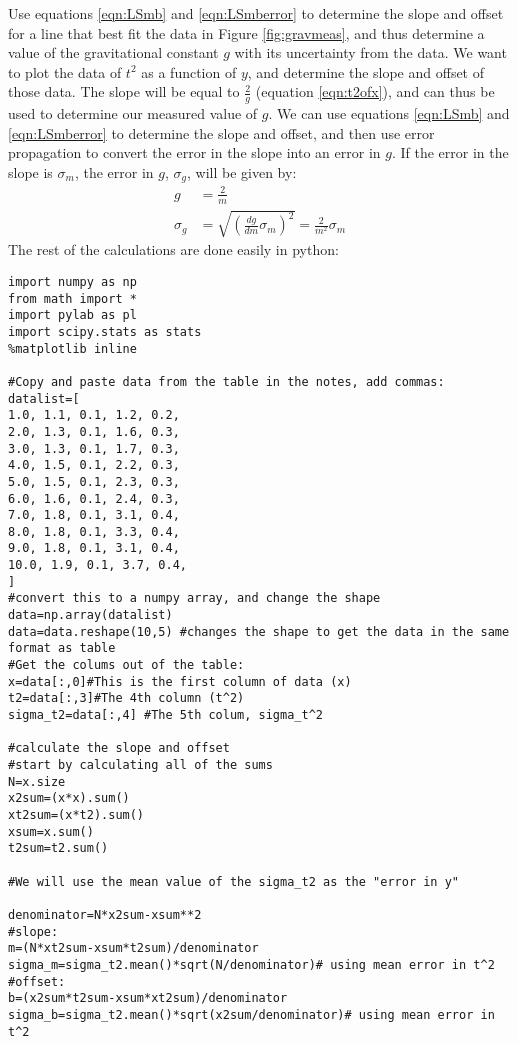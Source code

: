 \begin{example}{}{Use equations \ref{eqn:LSmb} and \ref{eqn:LSmberror} to determine the slope and offset for a line that best fit the data in Figure \ref{fig:gravmeas}, and thus determine a value of the gravitational constant $g$ with its uncertainty from the data.}{}
\label{ex:gravLMfit}
We want to plot the data of $t^2$ as a function of $y$, and determine the slope and offset of those data. The slope will be equal to $\frac{2}{g}$ (equation \ref{eqn:t2ofx}), and can thus be used to determine our measured value of $g$. We can use equations \ref{eqn:LSmb} and \ref{eqn:LSmberror} to determine the slope and offset, and then use error propagation to convert the error in the slope into an error in $g$. If the error in the slope is $\sigma_m$, the error in $g$, $\sigma_g$, will be given by:
\begin{align*}
g&=\frac{2}{m}\\
\sigma_g&=\sqrt{\left(\frac{dg}{dm}\sigma_m\right)^2}=\frac{2}{m^2}\sigma_m
\end{align*}
The rest of the calculations are done easily in python:
\clearpage
\begin{lstlisting}[frame=single] 
import numpy as np
from math import *
import pylab as pl
import scipy.stats as stats
%matplotlib inline

#Copy and paste data from the table in the notes, add commas:
datalist=[
1.0, 1.1, 0.1, 1.2, 0.2,
2.0, 1.3, 0.1, 1.6, 0.3,
3.0, 1.3, 0.1, 1.7, 0.3,
4.0, 1.5, 0.1, 2.2, 0.3,
5.0, 1.5, 0.1, 2.3, 0.3,
6.0, 1.6, 0.1, 2.4, 0.3,
7.0, 1.8, 0.1, 3.1, 0.4,
8.0, 1.8, 0.1, 3.3, 0.4,
9.0, 1.8, 0.1, 3.1, 0.4,
10.0, 1.9, 0.1, 3.7, 0.4,
]
#convert this to a numpy array, and change the shape
data=np.array(datalist)
data=data.reshape(10,5) #changes the shape to get the data in the same format as table
#Get the colums out of the table:
x=data[:,0]#This is the first column of data (x)
t2=data[:,3]#The 4th column (t^2)
sigma_t2=data[:,4] #The 5th colum, sigma_t^2

#calculate the slope and offset
#start by calculating all of the sums
N=x.size
x2sum=(x*x).sum()
xt2sum=(x*t2).sum()
xsum=x.sum()
t2sum=t2.sum()

#We will use the mean value of the sigma_t2 as the "error in y"

denominator=N*x2sum-xsum**2
#slope:
m=(N*xt2sum-xsum*t2sum)/denominator
sigma_m=sigma_t2.mean()*sqrt(N/denominator)# using mean error in t^2
#offset:
b=(x2sum*t2sum-xsum*xt2sum)/denominator
sigma_b=sigma_t2.mean()*sqrt(x2sum/denominator)# using mean error in t^2


\end{lstlisting}
\end{example}
